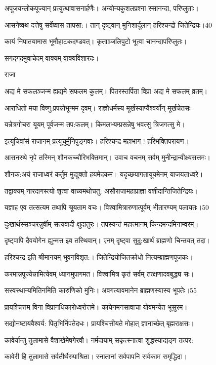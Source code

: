अपूजयन्लोकपूज्यान् प्रत्युत्थावासनार्हणैः।
अन्योन्यकुशलप्रश्ना स्सानन्दा, परिप्लुताः।

आसनेष्वथ दत्तेषु सर्वेष्वास तापसा:।
तान् दृष्ट्वान् मुनिशार्दूलान् हरिश्चन्द्रो जितेन्द्रियः।40

कायं निपातयामास भूमौहाटकदण्डवत्।
कृताञ्जलिपुटो भूत्वा चानन्दापरिप्लुतः।

सगद्गदमुवाचेदम् वाक्यम् वाक्यविशारदः।

राजा

अद्य मे सफलञ्जन्म ह्यद्यमे सफलम कुलम्।
पितरस्तर्पिता विप्रा अद्य मे सफलम् व्रतम्।

आराधितो मया विष्णु:प्रपन्नोभून्मम दृवम्।
राज्ञोधर्मस्य मूर्खस्याप्यैश्वर्योन् मूर्खचेतसः

यन्नेत्रगोचरा यूयम् पूर्वजन्म तप:फलम्।
किमलभ्यम्प्रसन्नेषु भवत्सु त्रिजगत्सु मे।

इत्यूचिवांसं राजानम् प्रत्यूचुर्मुनिपुङ्गवाः।
हरिश्चन्द्र महाभाग ! हरिभक्तिपरायण।

आसनस्थे नृपे तस्मिन् शौनकच्चौरिभक्तिमान्।
उवाच वचनम् सर्वम् मुनीन्द्रान्वीक्ष्यसत्तमः।

शौनक:अयं राजाध्वरं कर्तुम मुद्युक्तो हयमेदकम।
यदृच्छयागतायूयमेनम् याजयताध्वरे।

तद्वाक्यम् नारदागस्त्यो शृत्वा वाच्यमथोचतु:
असौराजामहाप्राज्ञा वशीदान्तिजितेन्द्रियः।

यज्ञाह एव तत्सत्यम तथापि श्रूयताम वचः।
विश्वामित्रारुणात्पूर्वम् भीतारण्यम् पलायतः।50

दुःखार्थस्सञ्चरन्नुर्वीम् सत्यवादी क्षुदातुरः।
तपस्यन्तं महात्मानम् किन्दमन्दमिनाम्वरम्।

दृष्ट्वापि दैवयोगेन ह्युन्मत्त इव तस्थिवान्।
एनम् दृष्ट्वा सुदु:खार्थं ब्राह्मणो चिन्तयत् तदा।

हरिश्चन्द्र इति श्रीमानयम् भुवनविशृत:।
जितेन्द्रियोजितक्रोधो नित्यम्ब्राह्मणपूजकः।

करमान्नपूज्येन्नामित्येवम् ध्यानमुपागमत।
विश्वामित्र कृतं सर्वम् तत्क्षणादवबुद्ध्य सः।

सस्वस्थान्यमितिनमिति कारुणिको मुनिः।
अवगत्यावमानेन ब्राह्मणस्यास्य भूपतेः।55

प्रायश्चित्तम विना विप्रानधिकारोध्वरोत्तमे।
कायेनमनसावाचा योवमन्येत भूसुरम।

सद्योनष्टायवैश्वर्य: पितृभिर्निपतेदधः।
प्रायश्चित्तीयते मोहात् ज्ञानाच्छेत् बृह्मराक्षसः।

कावेर्यान्तु तुलामासे वैशाखेमेषगेरवौ।
नर्मदायाम् सकृत्स्नात्वा शुद्धस्याद्यङ्ग तत्पर:

कावेरी हि तुलामासे सर्वतीर्थैरुपाश्रिता।
स्नातानां सर्वपापनि सर्वकाम समृद्धिदा।

